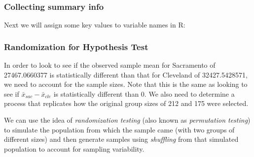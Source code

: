 \documentclass[]{tufte-book}
\newenvironment{Shaded}{\begin{snugshade}}{\end{snugshade}}
\newcommand{\DecValTok}[1]{\textcolor[rgb]{0.00,0.00,0.81}{{#1}}}
\newcommand{\StringTok}[1]{\textcolor[rgb]{0.31,0.60,0.02}{{#1}}}
\newcommand{\NormalTok}[1]{{#1}}
\begin{document}
\subsubsection{Collecting summary info}\label{collecting-summary-info-1}

Next we will assign some key values to variable names in R:

\begin{Shaded}
\end{Shaded}

\subsubsection{Randomization for Hypothesis
Test}\label{randomization-for-hypothesis-test-1}

In order to look to see if the observed sample mean for Sacramento of
27467.0660377 is statistically different than that for Cleveland of
32427.5428571, we need to account for the sample sizes. Note that this
is the same as looking to see if \(\bar{x}_{sac} - \bar{x}_{cle}\) is
statistically different than 0. We also need to determine a process that
replicates how the original group sizes of 212 and 175 were selected.

We can use the idea of \emph{randomization testing} (also known as
\emph{permutation testing}) to simulate the population from which the
sample came (with two groups of different sizes) and then generate
samples using \emph{shuffling} from that simulated population to account
for sampling variability.
\end{document}
